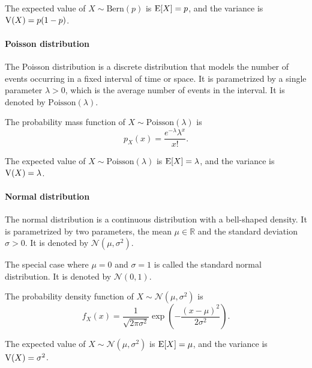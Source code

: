 The expected value of $X \sim \text{Bern}(p)$ is $\operatorname{E}[X] = p$, and the variance is
$\operatorname{V}(X) = p(1 - p)$.

\paragraph{Poisson distribution}  The Poisson distribution is a discrete distribution
that models the number of events occurring in a fixed interval of time or space.  It is
parametrized by a single parameter $\lambda > 0$, which is the average number of events
in the interval.  It is denoted by $\text{Poisson}(\lambda)$.

The probability mass function of $X \sim \text{Poisson}(\lambda)$ is
\begin{equation}
  \label{eq:poisson}
  p_X(x) = \frac{e^{-\lambda} \lambda^x}{x!}\text{.}
\end{equation}

The expected value of $X \sim \text{Poisson}(\lambda)$ is $\operatorname{E}[X] = \lambda$, and the
variance is $\operatorname{V}(X) = \lambda$.

\paragraph{Normal distribution} The normal distribution is a continuous distribution
with a bell-shaped density.  It is parametrized by two parameters, the mean $\mu \in
\mathbb{R}$ and the standard deviation $\sigma > 0$.  It is denoted by
$\mathcal{N}(\mu, \sigma^2)$.

The special case where $\mu = 0$ and $\sigma = 1$ is called the standard normal
distribution.  It is denoted by $\mathcal{N}(0, 1)$.

The probability density function of $X \sim \mathcal{N}(\mu, \sigma^2)$ is
\begin{equation}
  \label{eq:normal}
  f_X(x) = \frac{1}{\sqrt{2 \pi \sigma^2}} \exp\left(-\frac{(x - \mu)^2}{2 \sigma^2}\right)\text{.}
\end{equation}

The expected value of $X \sim \mathcal{N}(\mu, \sigma^2)$ is $\operatorname{E}[X] = \mu$, and the
variance is $\operatorname{V}(X) = \sigma^2$.

